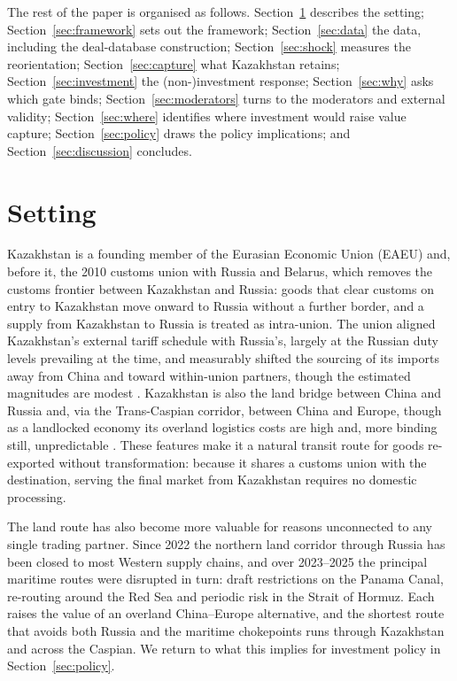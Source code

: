 \documentclass[12pt]{article}
\begin{document}
The rest of the paper is organised as follows. Section~\ref{sec:setting} describes the
setting; Section~\ref{sec:framework} sets out the framework; Section~\ref{sec:data} the data,
including the deal-database construction; Section~\ref{sec:shock} measures the reorientation;
Section~\ref{sec:capture} what Kazakhstan retains; Section~\ref{sec:investment} the
(non-)investment response; Section~\ref{sec:why} asks which gate binds;
Section~\ref{sec:moderators} turns to the moderators and external validity;
Section~\ref{sec:where} identifies where investment would raise value capture;
Section~\ref{sec:policy} draws the policy implications; and
Section~\ref{sec:discussion} concludes.

\section{Setting}\label{sec:setting}

Kazakhstan is a founding member of the Eurasian Economic Union (EAEU) and, before it, the 2010
customs union with Russia and Belarus, which removes the customs
frontier between Kazakhstan and Russia: goods that clear customs on entry to Kazakhstan move
onward to Russia without a further border, and a supply from Kazakhstan to Russia is treated
as intra-union. The union aligned Kazakhstan's external tariff schedule with Russia's, largely
at the Russian duty levels prevailing at the time, and measurably shifted the sourcing of its
imports away from China and toward within-union partners, though the estimated magnitudes are modest
\citep{isakova2016tariffs}. Kazakhstan is also the land bridge between China and Russia and,
via the Trans-Caspian corridor, between China and Europe, though as a landlocked economy its
overland logistics costs are high and, more binding still, unpredictable
\citep{arvis2010landlocked}. These features make it a natural transit route for goods
re-exported without transformation: because it shares a customs union with the destination,
serving the final market from Kazakhstan requires no domestic processing.

The land route has also become more valuable for reasons unconnected to any single trading
partner. Since 2022 the northern land corridor through Russia has been closed to most Western
supply chains, and over 2023--2025 the principal maritime routes were disrupted in turn: draft
restrictions on the Panama Canal, re-routing around the Red Sea and periodic risk in the
Strait of Hormuz. Each raises the value of an overland China--Europe alternative, and the
shortest route that avoids both Russia and the maritime chokepoints runs through Kazakhstan
and across the Caspian. We return to what this implies for investment policy in
Section~\ref{sec:policy}.
\end{document}
